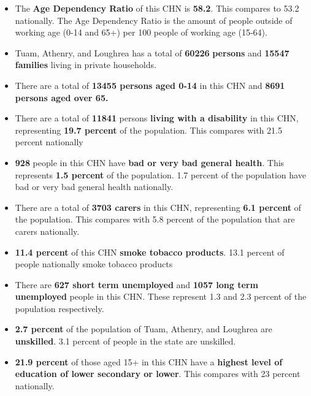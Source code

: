 \documentclass{article}
\begin{document}
\begin{itemize}

\item The \textbf{Age Dependency Ratio} of this CHN is  \textbf{58.2}. This compares to 53.2 nationally. The Age Dependency Ratio is the amount of people outside of working age (0-14 and 65+) per 100 people of working age (15-64). 

\item Tuam, Athenry, and Loughrea has a total of \textbf{\num{60226}} \textbf{persons} and  \textbf{\num{15547}} \textbf{families} living in private households.

\item There are a total of \textbf{\num{13455} persons aged 0-14} in this CHN and \textbf{\num{8691} persons aged over 65.} 

\item There are a total of \textbf{\num{11841}} persons \textbf{living with a disability} in this CHN, representing \textbf{19.7 percent} of the population. This compares with  21.5 percent nationally

\item \textbf{\num{928}} people in this CHN have \textbf{bad or very bad general health}. This represents \textbf{1.5 percent} of the population. 1.7 percent of the population have bad or very bad general health nationally. 

\item There are a total of \textbf{\num{3703} carers} in this CHN, representing \textbf{6.1 percent} of the population. This compares with 5.8 percent of the population that are carers nationally. 

\item \textbf{11.4 percent} of this CHN \textbf{smoke tobacco products}. 13.1 percent of people nationally smoke tobacco products

\item There are \textbf{\num{627} short term unemployed} and \textbf{\num{1057} long term unemployed} people in this CHN. These represent 1.3 and 2.3 percent of the population respectively.

\item  \textbf{2.7 percent} of the population of Tuam, Athenry, and Loughrea are \textbf{unskilled}. 3.1 percent of people in the state are unskilled.

\item \textbf{21.9 percent} of those aged 15+ in this CHN have a \textbf{highest level of education of lower secondary or lower}. This compares with 23 percent nationally. 


\end{itemize}
\end{document}
